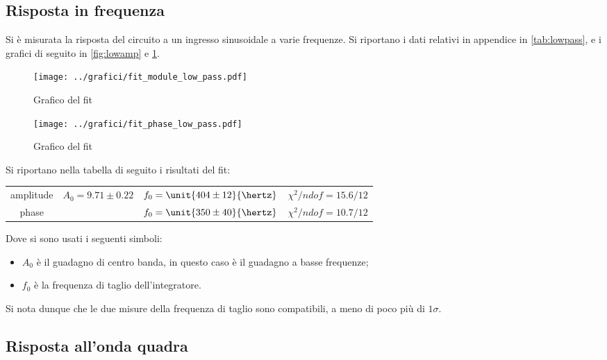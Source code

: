 \documentclass[10pt,a4paper]{article}
\begin{document}
\subsection{Risposta in frequenza}
Si è misurata la risposta del circuito a un ingresso sinusoidale a varie frequenze. Si riportano i dati relativi in appendice in \tablename{\ref{tab:lowpass}}, e i grafici di seguito in \figurename{\ref{fig:lowamp}} e \figurename{\ref{fig:lowph}}.

\begin{figure}[h!]
\centering
	\begin{minipage}[h!]{0.48\textwidth}
		\centering
		\texttt{[image: ../grafici/fit\_module\_low\_pass.pdf]}
		\caption{Grafico del fit }
		\label{fig:lowamp}
	\end{minipage}
	\begin{minipage}[h!]{0.48\textwidth}
		\centering
		\texttt{[image: ../grafici/fit\_phase\_low\_pass.pdf]}
		\caption{Grafico del fit }
		\label{fig:lowph}
	\end{minipage}
\end{figure}

Si riportano nella tabella di seguito i risultati del fit:

\begin{table}[h!]
\centering
\begin{tabular}{c|ccc}
amplitude	&	$A_0 = 9.71 \pm 0.22$	&	$f_0 = \unit{404 \pm 12}{\hertz}$	&	$\chi^2/ndof = 15.6 / 12$\\
phase		& &	$f_0 = \unit{350 \pm 40}{\hertz}$	&	$\chi^2/ndof = 10.7 / 12$
\end{tabular}
\end{table}

\noindent Dove si sono usati i seguenti simboli:
\begin{itemize}
\item $A_0$ è il guadagno di centro banda, in questo caso è il guadagno a basse frequenze;
\item $f_0$ è la frequenza di taglio dell'integratore.
\end{itemize}

Si nota dunque che le due misure della frequenza di taglio sono compatibili, a meno di poco più di $1\sigma$.

\subsection{Risposta all'onda quadra}
\end{document}
